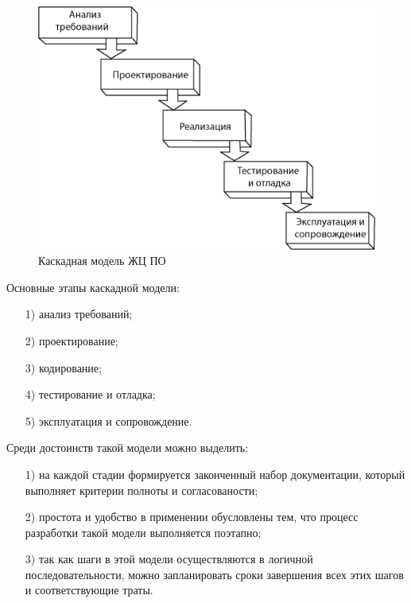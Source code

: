 \begin{figure}[h!]
    \center
    \includegraphics[scale=1]{fig/1.png}
    \caption{Каскадная модель ЖЦ ПО}
    \label{fig:1}
\end{figure}

Основные этапы каскадной модели: 
\begin{enumerate}
    \item [1)] анализ требований;
    \item [2)] проектирование;
    \item [3)] кодирование;
    \item [4)] тестирование и отладка;
    \item [5)] эксплуатация и сопровождение.
\end{enumerate}

Среди достоинств такой модели можно выделить:
\begin{enumerate}
    \item [1)] на каждой стадии формируется законченный набор документации, который выполняет критерии полноты и согласованости;
    \item [2)] простота и удобство в применении обусловлены тем, что процесс разработки такой модели выполняется поэтапно;
    \item [3)] так как шаги в этой модели осуществляются в логичной последовательности, можно запланировать сроки завершения всех этих шагов и соответствующие траты.
\end{enumerate}

